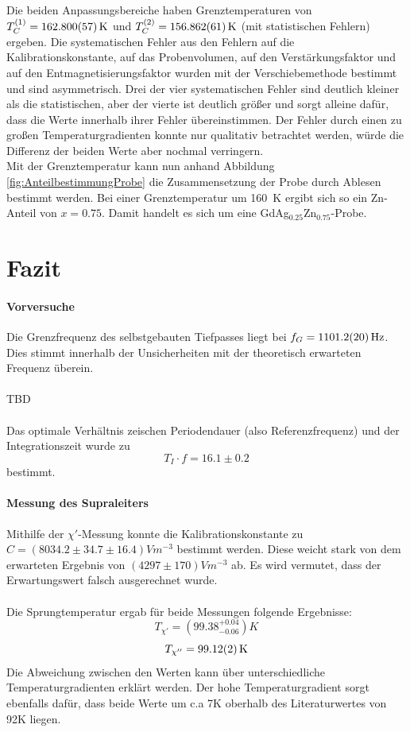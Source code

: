 \documentclass[12pt,a4paper]{article}
\begin{document}
Die beiden Anpassungsbereiche haben Grenztemperaturen von $T_C^{(1)} = \SI{162,800 \pm 0,057}{K}$ und $T_C^{(2)} = \SI{156,862 \pm 0,061}{K}$ (mit statistischen Fehlern) ergeben. Die systematischen Fehler aus den Fehlern auf die Kalibrationskonstante, auf das Probenvolumen, auf den Verstärkungsfaktor und auf den Entmagnetisierungsfaktor wurden mit der Verschiebemethode bestimmt und sind asymmetrisch. Drei der vier systematischen Fehler sind deutlich kleiner als die statistischen, aber der vierte ist deutlich größer und sorgt alleine dafür, dass die Werte innerhalb ihrer Fehler übereinstimmen. Der Fehler durch einen zu großen Temperaturgradienten konnte nur qualitativ betrachtet werden, würde die Differenz der beiden Werte aber nochmal verringern. \\
Mit der Grenztemperatur kann nun anhand Abbildung \ref{fig:AnteilbestimmungProbe} die Zusammensetzung der Probe durch Ablesen bestimmt werden. Bei einer Grenztemperatur um \SI{160}{K} ergibt sich so ein Zn-Anteil von $x = 0.75$. Damit handelt es sich um eine GdAg$_{0.25}$Zn$_{0.75}$-Probe.


\section{Fazit}
\paragraph{Vorversuche}
Die Grenzfrequenz des selbstgebauten Tiefpasses liegt bei $f_G = \SI{1101,2 \pm 2,0}{Hz}$. Dies stimmt innerhalb der Unsicherheiten mit der theoretisch erwarteten Frequenz überein.\\
\\
TBD\\
\\
Das optimale Verhältnis zeischen Periodendauer (also Referenzfrequenz) und der Integrationszeit wurde zu
\begin{equation*}
T_I \cdot f = 16.1\pm 0.2
\end{equation*}
bestimmt.
\paragraph{Messung des Supraleiters}
Mithilfe der $\chi'$-Messung konnte die Kalibrationskonstante zu $C = (8034.2\pm 34.7\pm 16.4)\si{Vm^{-3}}$ bestimmt werden. Diese weicht stark von dem erwarteten Ergebnis von $(4297\pm 170)\si{Vm^{-3}}$ ab. Es wird vermutet, dass der Erwartungswert falsch ausgerechnet wurde.\\
\\
Die Sprungtemperatur ergab für beide Messungen folgende Ergebnisse:
\begin{equation*}
T_{\chi'} = (99.38^{+0.04}_{-0.06}) K
\end{equation*}
\begin{equation*}
T_{\chi''} = \SI{99.12\pm 0.02}{K}
\end{equation*}
Die Abweichung zwischen den Werten kann über unterschiedliche Temperaturgradienten erklärt werden. Der hohe Temperaturgradient sorgt ebenfalls dafür, dass beide Werte um c.a 7K oberhalb des Literaturwertes von 92K liegen.
\end{document}
